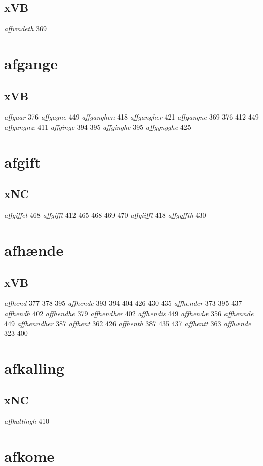 \documentclass[a4paper,twocolumn]{article}
\begin{document}
\subsection{xVB}
\label{sec:org68a3243}
\emph{affwndeth} 369 
\section{afgange}
\label{sec:org616e888}
\subsection{xVB}
\label{sec:orga6bef26}
\emph{affgaar} 376 \emph{affgagne} 449 \emph{affganghen} 418 \emph{affgangher} 421 \emph{affgangne} 369 376 412 449 \emph{affgangnæ} 411 \emph{affginge} 394 395 \emph{affginghe} 395 \emph{affgyngghe} 425 
\section{afgift}
\label{sec:org0e1a61b}
\subsection{xNC}
\label{sec:org5f40315}
\emph{affgiffet} 468 \emph{affgifft} 412 465 468 469 470 \emph{affgiifft} 418 \emph{affgyffth} 430 
\section{afhænde}
\label{sec:org90c56b5}
\subsection{xVB}
\label{sec:org490cab9}
\emph{affhend} 377 378 395 \emph{affhende} 393 394 404 426 430 435 \emph{affhender} 373 395 437 \emph{affhendh} 402 \emph{affhendhe} 379 \emph{affhendher} 402 \emph{affhendis} 449 \emph{affhendæ} 356 \emph{affhennde} 449 \emph{affhenndher} 387 \emph{affhent} 362 426 \emph{affhenth} 387 435 437 \emph{affhentt} 363 \emph{affhænde} 323 400 
\section{afkalling}
\label{sec:org55081f8}
\subsection{xNC}
\label{sec:org59347ee}
\emph{affkallingh} 410 
\section{afkome}
\label{sec:orgddfc4eb}
\end{document}
